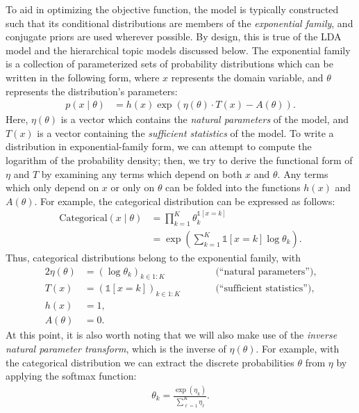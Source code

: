 \documentclass{article}
\newcommand{\indicator}{\mathds{1}}
\begin{document}
To aid in optimizing the objective function, the model is typically constructed such that its conditional distributions are members of the \emph{exponential family}, and conjugate priors are used wherever possible.
By design, this is true of the LDA model and the hierarchical topic models discussed below.
The exponential family \cite{wiki:expfamily} is a collection of parameterized sets of probability distributions which can be written in the following form, where $x$ represents the domain variable, and $\theta$ represents the distribution's parameters:
\begin{align}
p(x \mid \theta)
&=
h(x) \exp\left( \eta(\theta) \cdot T(x) - A(\theta) \right).
\end{align}
Here, $\eta(\theta)$ is a vector which contains the \emph{natural parameters} of the model, and $T(x)$ is a vector containing the \emph{sufficient statistics} of the model.
To write a distribution in exponential-family form, we can attempt to compute the logarithm of the probability density; then, we try to derive the functional form of $\eta$ and $T$ by examining any terms which depend on both $x$ and $\theta$.
Any terms which only depend on $x$ or only on $\theta$ can be folded into the functions $h(x)$ and $A(\theta)$.
For example, the categorical distribution can be expressed as follows:
\begin{align}
\text{Categorical}(x \mid \theta)
&= \prod_{k=1}^K \theta_k^{\indicator[x=k]} \\
&= \exp\left( \sum_{k=1}^K \indicator[x=k] \log \theta_k \right).
\end{align}
Thus, categorical distributions belong to the exponential family, with
\begin{alignat}{2}
\eta(\theta) &= (\log \theta_k)_{k \in 1:K} &\qquad& \text{(``natural parameters''),} \\
T(x) &= (\indicator[x = k])_{k \in 1:K} &\qquad& \text{(``sufficient statistics''),} \\
h(x) &= 1, \\
A(\theta) &= 0.
\end{alignat}
At this point, it is also worth noting that we will also make use of the \emph{inverse natural parameter transform}, which is the inverse of $\eta(\theta)$.
For example, with the categorical distribution we can extract the discrete probabilities $\theta$ from $\eta$ by applying the softmax function:
\begin{align}
\theta_k = \frac{\exp(\eta_k)}{\sum_{\ell=1}^K \eta_\ell}.
\end{align}
\end{document}
